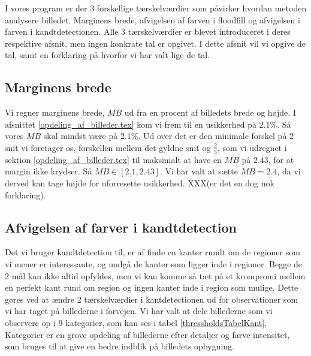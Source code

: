 I vores program er der 3 forskellige tærskelværdier som påvirker hvordan
metoden analysere billedet. Marginens brede, afvigelsen af farven i
floodfill og afvigelsen i farven i kandtdetectionen. Alle 3 tærskelværdier er
blevet introduceret i deres respektive afsnit, men ingen konkrate tal
er opgivet. I dette afsnit vil vi opgive de tal, samt en forklaring på
hvorfor vi har valt lige de tal.

\subsection{Marginens brede}
Vi regner marginens brede, $MB$ ud fra en procent af billedets brede og
højde. I afsnittet \ref{opdeling_af_billeder.tex} kom vi frem til en
usikkerhed på $2.1 \%$. Så vores $MB$ skal mindst
være på $2.1 \%$. Ud over det er den minimale forskel på 2 snit vi foretager os,
forskellen mellem det gyldne snit og $\frac{2}{3}$, som vi udregnet i
sektion \ref{opdeling_af_billeder.tex} til maksimalt at have en $MB$ på
$2.43$, for at margin ikke krydser. Så $MB \in [2.1, 2.43]$. Vi har valt
at sætte $MB = 2.4$, da vi derved kan tage højde for uforresette
usikkerhed. XXX(er det en dog nok forklaring).

\subsection{Afvigelsen af farver i kandtdetection}
Det vi bruger kandtdetection til, er af finde en kanter rundt om de
regioner som vi mener er interessante, og undgå de kanter som ligger
inde i regioner. Begge de 2 mål kan ikke altid opfyldes, men vi kan
komme så tæt på et krompromi mellem en perfekt kant rund om region og
ingen kanter inde i region som mulige. Dette gøres ved at ændre 2
tærskelværdier i kantdetectionen ud for observationer som vi har taget
på billederne i forvejen. Vi har valt at dele billederne som vi
observere op i 9 kategorier, som kan ses i tabel
\ref{thressholdsTabelKant}, Kategorier er en grove opdeling af
billederne efter detaljer og farve intensitet, som bruges til at give en
bedre indblik på billedets opbygning. 

